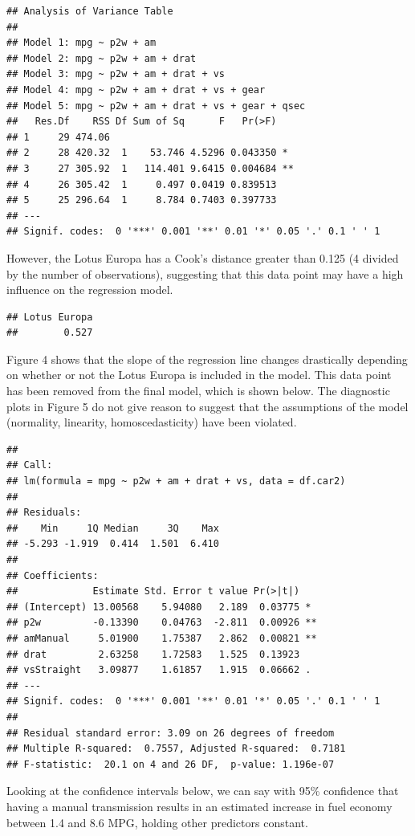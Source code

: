 \documentclass[]{article}
\begin{document}
\begin{verbatim}
## Analysis of Variance Table
## 
## Model 1: mpg ~ p2w + am
## Model 2: mpg ~ p2w + am + drat
## Model 3: mpg ~ p2w + am + drat + vs
## Model 4: mpg ~ p2w + am + drat + vs + gear
## Model 5: mpg ~ p2w + am + drat + vs + gear + qsec
##   Res.Df    RSS Df Sum of Sq      F   Pr(>F)   
## 1     29 474.06                                
## 2     28 420.32  1    53.746 4.5296 0.043350 * 
## 3     27 305.92  1   114.401 9.6415 0.004684 **
## 4     26 305.42  1     0.497 0.0419 0.839513   
## 5     25 296.64  1     8.784 0.7403 0.397733   
## ---
## Signif. codes:  0 '***' 0.001 '**' 0.01 '*' 0.05 '.' 0.1 ' ' 1
\end{verbatim}

However, the Lotus Europa has a Cook's distance greater than 0.125 (4
divided by the number of observations), suggesting that this data point
may have a high influence on the regression model.

\begin{verbatim}
## Lotus Europa 
##        0.527
\end{verbatim}

Figure 4 shows that the slope of the regression line changes drastically
depending on whether or not the Lotus Europa is included in the model.
This data point has been removed from the final model, which is shown
below. The diagnostic plots in Figure 5 do not give reason to suggest
that the assumptions of the model (normality, linearity,
homoscedasticity) have been violated.

\begin{verbatim}
## 
## Call:
## lm(formula = mpg ~ p2w + am + drat + vs, data = df.car2)
## 
## Residuals:
##    Min     1Q Median     3Q    Max 
## -5.293 -1.919  0.414  1.501  6.410 
## 
## Coefficients:
##             Estimate Std. Error t value Pr(>|t|)   
## (Intercept) 13.00568    5.94080   2.189  0.03775 * 
## p2w         -0.13390    0.04763  -2.811  0.00926 **
## amManual     5.01900    1.75387   2.862  0.00821 **
## drat         2.63258    1.72583   1.525  0.13923   
## vsStraight   3.09877    1.61857   1.915  0.06662 . 
## ---
## Signif. codes:  0 '***' 0.001 '**' 0.01 '*' 0.05 '.' 0.1 ' ' 1
## 
## Residual standard error: 3.09 on 26 degrees of freedom
## Multiple R-squared:  0.7557, Adjusted R-squared:  0.7181 
## F-statistic:  20.1 on 4 and 26 DF,  p-value: 1.196e-07
\end{verbatim}

Looking at the confidence intervals below, we can say with 95\%
confidence that having a manual transmission results in an estimated
increase in fuel economy between 1.4 and 8.6 MPG, holding other
predictors constant.
\end{document}
